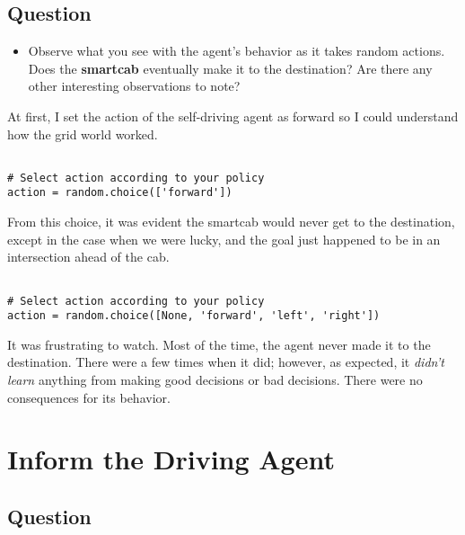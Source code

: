 \documentclass[twoside,openright,titlepage,numbers=noenddot,headinclude,%
               footinclude=true,cleardoublepage=empty,abstractoff,BCOR=5mm,%
               paper=a4,fontsize=11pt,ngerman,american]{scrreprt}
\numberwithin{theorem}{chapter}
\numberwithin{definition}{chapter}
\numberwithin{algorithm}{chapter}
\numberwithin{figure}{chapter}
\numberwithin{table}{chapter}
\numberwithin{equation}{chapter}
\begin{document}
\section*{Question}

\begin{itemize}
\item Observe what you see with the agent's behavior as it takes random actions. Does the \textbf{smartcab} eventually make it to the destination? Are there any other interesting observations to note?
\end{itemize}




 


At first, I set the action of the self-driving agent as forward so I could understand how the grid world worked. 
\begin{verbatim}

# Select action according to your policy
action = random.choice(['forward'])

\end{verbatim}

From this choice, it was evident the smartcab would never get to the destination, except in the case when we were lucky, and the goal just happened to be in an intersection ahead of the cab.
\begin{verbatim}

# Select action according to your policy
action = random.choice([None, 'forward', 'left', 'right'])

\end{verbatim}

It was frustrating to watch. Most of the time, the agent never made it to the destination. There were a few times when it did; however, as expected, it \emph{didn't learn} anything from making good decisions or bad decisions. There were no consequences for its behavior.  




%
%

\chapter*{Inform the Driving Agent}

\section*{Question}
\end{document}
